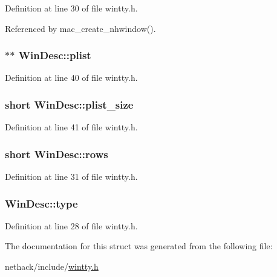 Definition at line 30 of file wintty.\+h.



Referenced by mac\+\_\+create\+\_\+nhwindow().

\hypertarget{structWinDesc_a5fdccb1a52b4dbd1d517e39af1d944ac}{
\subsubsection[{plist}]{$\ast$$\ast$ Win\+Desc\+::plist}}\label{structWinDesc_a5fdccb1a52b4dbd1d517e39af1d944ac}


Definition at line 40 of file wintty.\+h.

\hypertarget{structWinDesc_a918937c92262bb2a5994c9202194ab2c}{
\subsubsection[{plist\+\_\+size}]{\setlength{\rightskip}{0pt plus 5cm}short Win\+Desc\+::plist\+\_\+size}}\label{structWinDesc_a918937c92262bb2a5994c9202194ab2c}


Definition at line 41 of file wintty.\+h.

\hypertarget{structWinDesc_a078492b79dc8211d11efdb70ab2ad92e}{
\subsubsection[{rows}]{\setlength{\rightskip}{0pt plus 5cm}short Win\+Desc\+::rows}}\label{structWinDesc_a078492b79dc8211d11efdb70ab2ad92e}


Definition at line 31 of file wintty.\+h.

\hypertarget{structWinDesc_a822c0b26f00f618fc89fadb389cd8bfa}{
\subsubsection[{type}]{ Win\+Desc\+::type}}\label{structWinDesc_a822c0b26f00f618fc89fadb389cd8bfa}


Definition at line 28 of file wintty.\+h.



The documentation for this struct was generated from the following file\+:\begin{DoxyCompactItemize}
\item 
nethack/include/\hyperlink{wintty_8h}{wintty.\+h}\end{DoxyCompactItemize}
